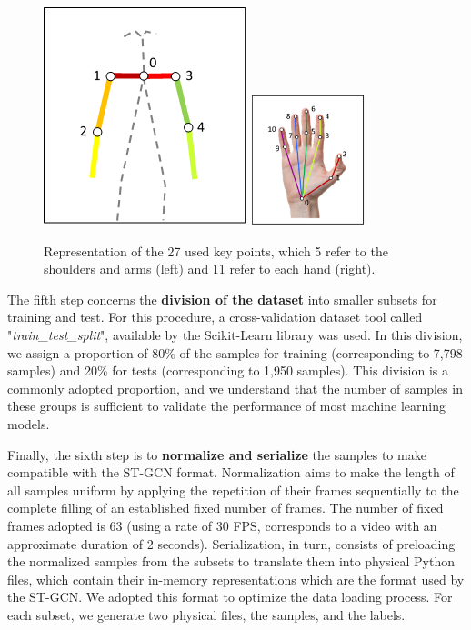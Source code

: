 \begin{figure}[ht]
    \centering
    \includegraphics[width=3.5
    cm]{images/filtered_keypoints_body}
    \includegraphics[width=3.3cm]{images/filtered_keypoints_hand}
    \caption{Representation of the 27 used key points, which 5 refer to the shoulders and arms (left) and 11 refer to each hand (right).}
    \label{fig:filtered-keypoints}
\end{figure}


The fifth step concerns the \textbf{division of the dataset} into smaller subsets for training and test. For this procedure, a cross-validation dataset tool called "\textit{train\_test\_split}", available by the Scikit-Learn \cite{scikit-learn} library was used. In this division, we assign a proportion of 80\% of the samples for training (corresponding to 7,798 samples) and 20\% for tests (corresponding to 1,950 samples). This division is a commonly adopted proportion, and we understand that the number of samples in these groups is sufficient to validate the performance of most machine learning models.

Finally, the sixth step is to \textbf{normalize and serialize} the samples to make compatible with the ST-GCN format. Normalization aims to make the length of all samples uniform by applying the repetition of their frames sequentially to the complete filling of an established fixed number of frames. The number of fixed frames adopted is 63 (using a rate of 30 FPS, corresponds to a video with an approximate duration of 2 seconds). Serialization, in turn, consists of preloading the normalized samples from the subsets to translate them into physical Python \cite{python} files, which contain their in-memory representations which are the format used by the ST-GCN. We adopted this format to optimize the data loading process. For each subset, we generate two physical files, the samples, and the labels.

